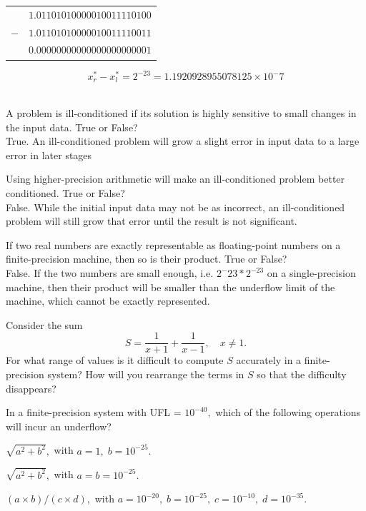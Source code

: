 	\begin{center}
	\begin{tabular}{cc}
		&$1.01101010000010011110100$ \\
		$-$ & $1.01101010000010011110011$ \\
		\hline
		&$0.00000000000000000000001$ \\
	\end{tabular}
	\end{center}

	$$x^*_r - x^*_l = 2^{-23} = 1.1920928955078125×10^-7$$ \\

\eenum

\item
\benum
\item A problem is ill-conditioned if its solution is highly sensitive to small changes in the input data.  True or False? \\
	True. An ill-conditioned problem will grow a slight error in input data to a large error in later stages \\

\item Using higher-precision arithmetic will make an ill-conditioned problem better conditioned.  True or False? \\
	False. While the initial input data may not be as incorrect, an ill-conditioned problem will still grow that error until the result
	is not significant. \\

\item  If two real numbers are exactly representable as floating-point numbers on a finite-precision machine, then so is their product.  True or False? \\
	False. If the two numbers are small enough, i.e. $2^-{23} * 2^{-23}$ on a single-precision machine, then their product will be
	smaller than the underflow limit of the machine, which cannot be exactly represented.
\item  Consider the sum
\[
S = \frac{1}{x+1} + \frac{1}{x-1}, \quad x \ne 1.
\]
For what range of values is it difficult to compute $S$ accurately in a finite-precision system?  How will you rearrange the terms in $S$ so that the difficulty disappears?
\item In a finite-precision system with UFL = $10^{-40},$ which of the following operations will incur an underflow?
\benum
\item $\sqrt{a^2+b^2},$ with $a=1, \; b=10^{-25}.$
\item $\sqrt{a^2+b^2},$ with $a=b=10^{-25}.$
\item $(a\times b)/(c \times d),$ with $a=10^{-20}, \; b=10^{-25}, \; c=10^{-10}, \; d=10^{-35}.$
\eenum

\eenum

\eenum

